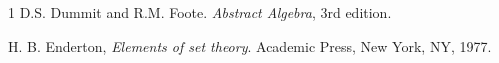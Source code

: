 \documentclass[12pt,a4paper]{article}
\begin{document}
\clearpage
\pagestyle{plain}


\begin{thebibliography}{1}
	 D.S. Dummit and R.M. Foote. \emph{Abstract Algebra}, 3rd edition.
	
	H. B. Enderton, \emph{Elements of set theory}. Academic Press, New York, NY, 1977.
\end{thebibliography}
\end{document}
